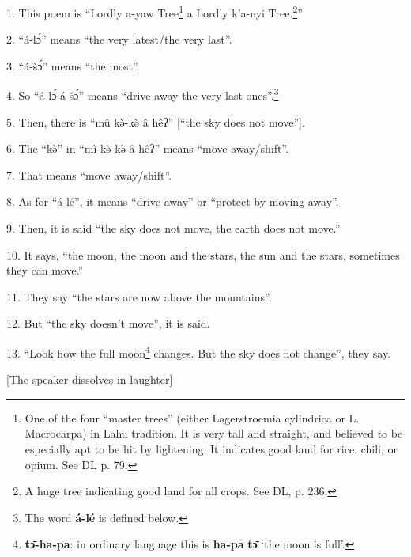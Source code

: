 \setcounter{footnote}{0}

1. This poem is ``Lordly a-yaw Tree\footnote{One of the four ``master trees'' (either Lagerstroemia cylindrica or L. Macrocarpa) in Lahu tradition. It is very tall and straight, and believed to be especially apt to be hit by lightening. It indicates good land for rice, chili, or opium. See DL p. 79.} a Lordly k'a-nyi Tree.\footnote{A huge tree indicating good land for all crops. See DL, p. 236.}''

2. ``á-lɔ́'' means ``the very latest/the very last''.

3. ``á-šɔ́'' means ``the most''.

4. So ``á-lɔ́-á-šɔ́'' means ``drive away the very last ones''.\footnote{The word \textbf{á-lé} is defined below.}

5. Then, there is ``mû kə̀-kə̀ â hêʔ'' [``the sky does not move''].

6. The ``kə̀'' in ``mì kə̀-kə̀ â hêʔ'' means ``move away/shift''.

7. That means ``move away/shift''.

8. As for ``á-lé'', it means ``drive away'' or ``protect by moving away''.

9. Then, it is said ``the sky does not move, the earth does not move.''

10. It says, ``the moon, the moon and the stars, the sun and the stars, sometimes
they can move.''

11. They say ``the stars are now above the mountains''.

12. But ``the sky doesn't move'', it is said.

13. ``Look how the full moon\footnote{\textbf{tɔ̄-ha-pa}: in ordinary language this is \textbf{ha-pa} \textbf{tɔ̄} `the moon is full'.} changes. But the sky does not change'', they say.

[The speaker dissolves in laughter]

